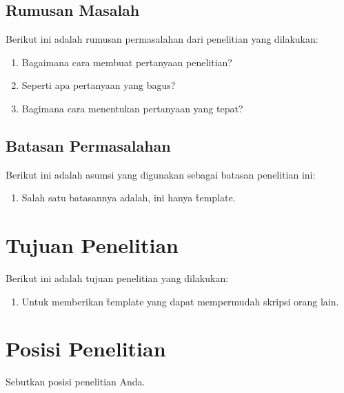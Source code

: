 \subsection{Rumusan Masalah}
Berikut ini adalah rumusan permasalahan dari penelitian yang dilakukan:
\begin{enumerate}
\item Bagaimana cara membuat pertanyaan penelitian?

\item Seperti apa pertanyaan yang bagus?

\item Bagimana cara menentukan pertanyaan yang tepat?
\end{enumerate}


\subsection{Batasan Permasalahan}
Berikut ini adalah asumsi yang digunakan sebagai batasan penelitian ini:
\begin{enumerate}
	\item Salah satu batasannya adalah, ini hanya \f{template}.
\end{enumerate}


\section{Tujuan Penelitian}
Berikut ini adalah tujuan penelitian yang dilakukan:
\begin{enumerate}
	\item Untuk memberikan \f{template} yang dapat mempermudah skripsi orang lain.
\end{enumerate}


\section{Posisi Penelitian}
Sebutkan posisi penelitian Anda.

